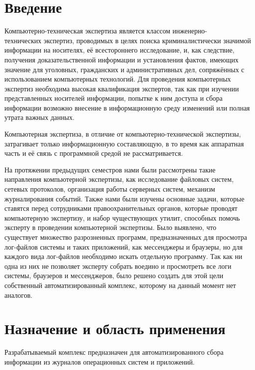 \documentclass[russian,utf8,14pt,simple]{eskdtext}
\begin{document}
\newpage
{}
\renewcommand\contentsname{\hfill Содержание \hfill}
\tableofcontents

\newpage
{}
\section{Введение}

Компьютерно-техническая экспертиза является классом инженерно-\\технических экспертиз, проводимых в целях поиска криминалистически значимой информации на носителях, её всестороннего исследование, и, как следствие, получения доказательственной информации и установления фактов, имеющих значение для уголовных, гражданских и административных дел, сопряжённых с использованием компьютерных технологий. Для проведения компьютерных экспертиз необходима высокая квалификация экспертов, так как при изучении представленных носителей информации, попытке к ним доступа и сбора информации возможно внесение в информационную среду изменений или полная утрата важных данных.

Компьютерная экспертиза, в отличие от компьютерно-технической экспертизы, затрагивает только информационную составляющую, в то время как аппаратная часть и её связь с программной средой не рассматривается.

На протяжении предыдущих семестров нами были рассмотрены такие направления компьютерной экспертизы, как исследование файловых систем, сетевых протоколов, организация работы серверных систем, механизм журналирования событий. Также нами были изучены основные задачи, которые ставятся перед сотрудниками правоохранительных органов, которые проводят компьютерную экспертизу, и набор чуществующих утилит, способных помочь эксперту в проведении компьютерной экспертизы. Было выявлено, что существует множество разрозненных программ, предназначенных для просмотра лог-файлов системы и таких приложений, как мессенджеры и браузеры, но для каждого вида лог-файлов необходимо искать отдельную программу. Так как ни одна из них не позволяет эксперту собрать воедино и просмотреть все логи системы, браузеров и мессенджеров, было решено создать для этой цели собственный автоматизированный комплекс, которому на данный момент нет аналогов.

\section{Назначение и область применения}
Разрабатываемый комплекс предназначен для автоматизированного сбора информации из журналов операционных систем и приложений.
\end{document}

